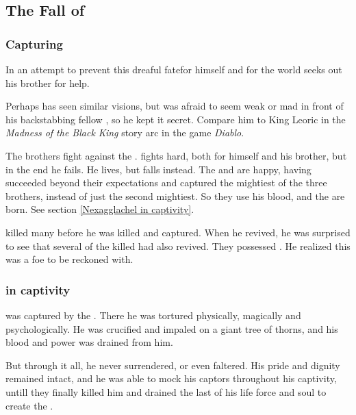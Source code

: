 \subsection{The Fall of \Nexagglachel}





\subsubsection{Capturing \Nexagglachel}
In an attempt to prevent this dreaful fate\dash for himself and for the world\dash \Ishnaruchaefir{} seeks out his brother \Nexagglachel{} for help. 

Perhaps \Nexagglachel{} has seen similar visions, but was afraid to seem weak or mad in front of his backstabbing fellow \dragons, so he kept it secret. 
Compare him to King Leoric in the \emph{Madness of the Black King} story arc in the game \emph{Diablo}. 

The brothers fight against the \banes. 
\Ishnaruchaefir{} fights hard, both for himself and his brother, but in the end he fails. 
He lives, but \Nexagglachel{} falls instead. 
The \banes{} and \resphain{} are happy, having succeeded beyond their expectations and captured the mightiest of the three brothers, instead of just the second mightiest. 
So they use his blood, and the \satharioth{} are born. 
See section \ref{Nexagglachel in captivity}.

\Nexagglachel killed many \resphain before he was killed and captured.
When he revived, he was surprised to see that several of the killed \resphain had also revived.
They possessed .
He realized this was a foe to be reckoned with.






\subsubsection{\Nexagglachel{} in captivity}
\Nexagglachel{} was captured by the \banes{}. 
There he was tortured physically, magically and psychologically. 
He was crucified and impaled on a giant tree of thorns, and his blood and power was drained from him.

But through it all, he never surrendered, or even faltered. His pride and dignity remained intact, and he was able to mock his captors throughout his captivity, untill they finally killed him and drained the last of his life force and soul to create the \satharioth. 

